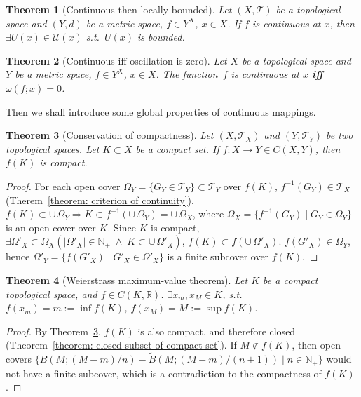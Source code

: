 \documentclass[openany]{book}
\theoremstyle{plain}
\newtheorem{theorem}{Theorem}[section] %
\theoremstyle{definition}
\newcommand{\emphbf}[1]{\emph{\textbf{#1}}}
\begin{document}
\begin{theorem}[Continuous then locally bounded]
	Let $(X, \mathscr T)$ be a topological space and $(Y, d)$ be a metric space, $f \in Y^X$, $x \in X$. 
	If $f$ is continuous at $x$, then $\exists U(x) \in \mathscr U(x)$ s.t.\ $U(x)$ is bounded.
\end{theorem}

\begin{theorem}[Continuous iff oscillation is zero]
		\label{theorem: continuous iff oscillation is zero}
	Let $X$ be a topological space and $Y$ be a metric space, $f \in Y^X$, $x \in X$. 
	The function~$f$ is continuous at $x$ \emphbf{iff} $\omega(f; x) = 0$. 	
\end{theorem}

Then we shall introduce some global properties of continuous mappings.

\begin{theorem}[Conservation of compactness]
		\label{theorem: conservation of compactness}
	Let $(X, \mathscr T_X)$ and $(Y, \mathscr T_Y)$ be two topological spaces. 
	Let $K \subset X$ be a compact set. 
	If $f \colon X \to Y \in C(X, Y)$, then $f(K)$ is compact.
\end{theorem}
\begin{proof}
	For each open cover $\Omega_Y = \{ G_Y \in \mathscr T_Y\} \subset \mathscr T_Y$ over $f( K)$, $f^{-1} ( G_Y) \in \mathscr T_X$ (Therem~\ref{theorem: criterion of continuity}). $f( K) \subset \cup\,\Omega_Y \Rightarrow K \subset f^{-1} \left(  \cup\,\Omega_Y \right) = \cup\,\Omega_X $, where $\Omega_X = \{ f^{-1} ( G_Y) \mid G_Y \in \Omega_Y\} $ is an open cover over $K$. Since $K$ is compact,
	$\exists \Omega'_X \subset \Omega_X\left( 
	\lvert \Omega'_X \rvert \in \mathbb{N}_+ 
	\;\wedge\;K\subset \cup\,\Omega'_X
	\right)$, $f( K) \subset f ( \cup\,\Omega'_X) $. $f ( G'_X) \in \Omega_Y$, hence $\Omega'_Y = \{ f ( G'_X) \mid G'_X \in \Omega'_X\}$ is a finite subcover over $f( K)$.
\end{proof}


\begin{theorem}[Weierstrass maximum-value theorem]
	\label{theorem: Weierstrass maximum-value}
	Let $K$ be a compact topological space, and $f \in C (K, \mathbb R)$.
	$\exists x_m, x_M \in K$, s.t.\ $f(x_m) = m := \inf f(K)$, $f(x_M) = M := \sup f(K)$.
\end{theorem}
\begin{proof}
	By Theorem~\ref{theorem: conservation of compactness}, $f(K)$ is also compact, and therefore closed (Theorem~\ref{theorem: closed subset of compact set}). 
	If $M \notin f(K)$, then open covers $\{ B(M; (M-m)/n) - \tilde B(M; (M-m)/(n + 1)) \mid  n \in \mathbb N_+\} $ would not have a finite subcover, which is a contradiction to the compactness of $f(K)$.
\end{proof}
\end{document}
